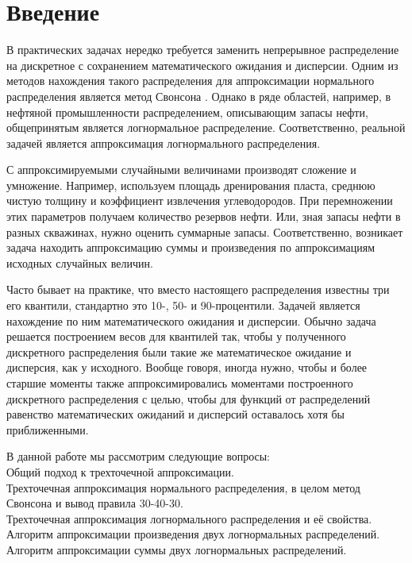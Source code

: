 \documentclass[12pt]{article}
\begin{document}
	
	
	
	\tableofcontents
	\pagebreak
	
	\section{Введение}
	
	В практических задачах нередко требуется заменить непрерывное распределение на
	дискретное с сохранением математического ожидания и дисперсии. Одним из методов
	нахождения такого распределения для аппроксимации нормального распределения является метод Свонсона \cite{Swansong}. Однако в ряде областей, например, в нефтяной промышленности распределением, описывающим запасы нефти, общепринятым является логнормальное распределение. Соответственно, реальной задачей является аппроксимация логнормального распределения.
	
	С аппроксимируемыми случайными величинами производят сложение и умножение.
	Например, используем площадь дренирования пласта, среднюю чистую толщину и коэффициент извлечения углеводородов. При перемножении этих параметров получаем количество резервов нефти. Или, зная запасы нефти в разных скважинах, нужно оценить суммарные запасы.
	Соответственно, возникает задача находить аппроксимацию суммы и произведения по аппроксимациям исходных случайных величин.
	
	Часто бывает на практике, что вместо настоящего распределения известны три его квантили, стандартно это 10-, 50- и 90-процентили. Задачей является нахождение по ним математического ожидания и дисперсии. Обычно задача решается построением весов для квантилей так, чтобы у полученного дискретного распределения были такие же математическое ожидание и дисперсия, как у исходного. Вообще говоря, иногда нужно, чтобы и более старшие моменты также аппроксимировались моментами построенного дискретного распределения с целью, чтобы для функций от распределений равенство математических ожиданий и дисперсий оставалось хотя бы приближенными.
	
	В данной работе мы рассмотрим следующие вопросы:\\
	Общий подход к трехточечной аппроксимации.\\
	Трехточечная аппроксимация нормального распределения, в целом метод Свонсона и вывод правила 30-40-30.\\
	Трехточечная аппроксимация логнормального распределения и её свойства.\\
	Алгоритм аппроксимации произведения двух логнормальных распределений.\\
	Алгоритм аппроксимации суммы двух логнормальных распределений.
	
\end{document}
